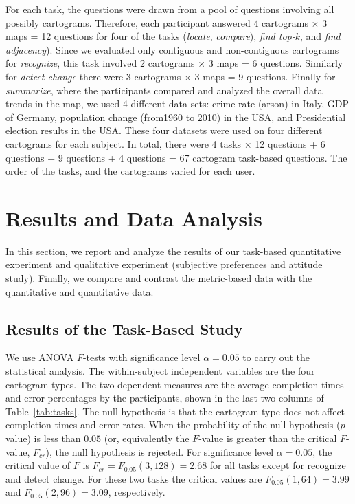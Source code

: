 \documentclass[10pt,journal,compsoc]{IEEEtran}
\begin{document}
For each task, the questions were drawn from a pool of questions involving all possibly cartograms. 
Therefore, each participant answered 4 cartograms $\times$ 3 maps = 12 questions for four of the tasks (\textit{locate}, \textit{compare}), \textit{find top-$k$}, and \textit{find adjacency}). Since we evaluated only contiguous and non-contiguous cartograms for \textit{recognize}, this task involved 2 cartograms $\times$ 3 maps = 6 questions. Similarly for \textit{detect change} there were 3 cartograms $\times$ 3 maps = 9 questions. Finally for \textit{summarize}, where the participants compared and analyzed the overall data trends in the map, we used 4 different data sets: crime rate (arson) in Italy, GDP of Germany, population change (from1960 to 2010) in the USA, and Presidential election results in the USA. These four datasets were used on four different cartograms for each subject. In total, there were 4 tasks $\times$ 12 questions +  6 questions + 9 questions + 4 questions = 67 cartogram task-based questions. 
The order of the tasks, and the cartograms varied for each user. 




\section{Results and Data Analysis}
\label{sec:results}

In this section, we report and analyze the results of our task-based quantitative experiment and qualitative experiment (subjective preferences and attitude study). Finally, we compare and contrast the metric-based data with the quantitative and quantitative data.



\subsection{Results of the Task-Based Study}


We use ANOVA $F$-tests with significance level $\alpha = 0.05$ to carry out the statistical analysis. The within-subject independent variables are the four cartogram types. The two dependent measures are the average completion times and error percentages by the participants, shown in the last two columns of Table~\ref{tab:tasks}. 
The null hypothesis is that the cartogram type does not affect completion times and error rates. 
 When the probability of the null hypothesis ($p$-value) is less than $0.05$ (or, equivalently the $F$-value is greater than the critical $F$-value, $F_{cr}$), the null hypothesis is rejected. For significance level
 $\alpha = 0.05$, the critical value of $F$ is  $F_{cr}=F_{0.05}(3,128)=2.68$ for all tasks except for recognize and detect change. For these two tasks the critical values are $F_{0.05}(1,64)=3.99$ and $F_{0.05}(2,96)=3.09$, respectively. 
 
\end{document}
